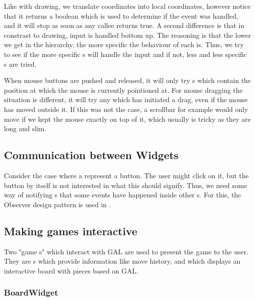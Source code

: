 

Like with drawing, we translate coordinates into local coordinates, however
notice that it returns a boolean which is used to determine if the event was
handled, and it will stop as soon as any callee returns true. A second
difference is that in constrast to drawing, input is handled bottom up. The
reasoning is that the lower we get in the hierarchy, the more specific the
behaviour of each  is. Thus, we try to see if the more specific
s will handle the input and if not, less and less specific
s are tried.

When mouse buttons are pushed and released, it will only try s
which contain the position at which the mouse is currently pointioned at. For
mouse dragging the situation is different, it will try any 
which has initiated a drag, even if the mouse has moved outside it. If this was
not the case, a scrollbar for example would only move if we kept the mouse
exactly on top of it, which usually is tricky as they are long and slim.

\subsection{Communication between Widgets}
\label{sec:communication}

Consider the case where a  represent a button. The user might
click on it, but the button by itself is not interested in what this should
signify. Thus, we need some way of notifying s that some events
have happened inside other s. For this, the Observer design
pattern is used in .

\subsection{Making games interactive}
\label{sec:interaction}

Two "game s" which interact with GAL are used to present the
game to the user. They are s which provide information
like move history, and  which displays an interactive
board with pieces based on GAL.

\subsubsection{BoardWidget}

